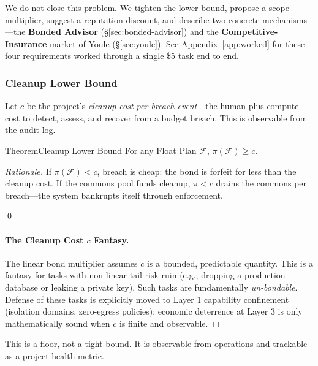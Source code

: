 \documentclass[11pt,a4paper]{article}
\theoremstyle{definition}
\theoremstyle{remark}
\begin{document}
We do not close this problem. We tighten the lower bound, propose a scope multiplier, suggest a reputation discount, and describe two concrete mechanisms---the \textbf{Bonded Advisor} (\S\ref{sec:bonded-advisor}) and the \textbf{Competitive-Insurance} market of Youle (\S\ref{sec:youle}). See Appendix~\ref{app:worked} for these four requirements worked through a single \$5 task end to end.

\subsubsection{Cleanup Lower Bound}\label{sec:cleanup-bound}

Let $c$ be the project's \emph{cleanup cost per breach event}---the human-plus-compute cost to detect, assess, and recover from a budget breach. This is observable from the audit log.
%

\begin{pdclaim}{Theorem}{Cleanup Lower Bound}
\setlength{\parskip}{4pt plus 1pt}
\label{thm:cleanup-bound}
For any Float Plan $\mathcal{F}$, $\pi(\mathcal{F}) \geq c$.
\end{pdclaim}

\begin{proof}[Rationale]
\setlength{\parskip}{4pt plus 1pt}
If $\pi(\mathcal{F}) < c$, breach is cheap: the bond is forfeit for less than the cleanup cost. If the commons pool funds cleanup, $\pi < c$ drains the commons per breach---the system bankrupts itself through enforcement. 

\qed

\paragraph{The Cleanup Cost $c$ Fantasy.}
The linear bond multiplier assumes $c$ is a bounded, predictable quantity. This is a fantasy for tasks with non-linear tail-risk ruin (e.g., dropping a production database or leaking a private key). Such tasks are fundamentally \emph{un-bondable}. Defense of these tasks is explicitly moved to Layer 1 capability confinement (isolation domains, zero-egress policies); economic deterrence at Layer 3 is only mathematically sound when $c$ is finite and observable.
\end{proof}

This is a floor, not a tight bound. It is observable from operations and trackable as a project health metric.
\end{document}
